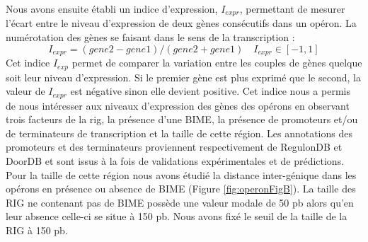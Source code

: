 \documentclass[12pt,a4paper]{report}
\begin{document}
\begin{onehalfspace}
\begin{figure}[ht]
\label{fig:operon}
\end{figure}

Nous avons ensuite établi un indice d'expression, $I_{expr}$, permettant de mesurer l'écart entre le niveau d'expression de deux gènes consécutifs dans un opéron. La numérotation des gènes se faisant dans le sens de la transcription :
\[ I_{expr} = (gene2 - gene1) / (gene2 + gene1) \quad I_{expr} \in [-1,1]\]
Cet indice $I_{exp}$ permet de comparer la variation entre les couples de gènes quelque soit leur niveau d'expression. Si le premier gène est plus exprimé que le second, la valeur de $I_{expr}$ est négative sinon elle devient positive. Cet indice nous a permis de nous intéresser aux niveaux d'expression des gènes des opérons en observant trois facteurs de la \gls{rig}, la présence d'une BIME, la présence de promoteurs et/ou de terminateurs de transcription et la taille de cette région. Les annotations des promoteurs et des terminateurs proviennent respectivement de RegulonDB et DoorDB et sont issus à la fois de validations expérimentales et de prédictions. Pour la taille de cette région nous avons étudié la distance inter-génique dans les opérons en présence ou absence de BIME (Figure \autoref{fig:operonFigB}). La taille des RIG ne contenant pas de BIME possède une valeur modale de 50 pb alors qu'en leur absence celle-ci se situe à 150 pb. Nous avons fixé le seuil de la taille de la RIG à 150 pb.


\end{onehalfspace}
\end{document}
